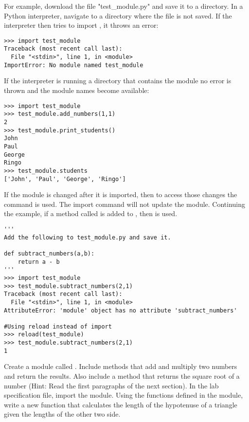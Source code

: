 For example, download the file "test\_module.py" and save it to a directory.
In a Python interpreter, navigate to a directory where the file is not saved.
If the interpreter then tries to import , it throws an error:

\begin{lstlisting}
>>> import test_module
Traceback (most recent call last):
  File "<stdin>", line 1, in <module>
ImportError: No module named test_module
\end{lstlisting}

If the interpreter is running a directory that contains the module no error is thrown and the module names become available:

\begin{lstlisting}
>>> import test_module
>>> test_module.add_numbers(1,1)
2
>>> test_module.print_students()
John
Paul
George
Ringo
>>> test_module.students
['John', 'Paul', 'George', 'Ringo']
\end{lstlisting}

If the module is changed after it is imported, then to access those changes the  command is used.
The import command will not update the module.
Continuing the example, if a method called  is added to , then  is used.

\begin{lstlisting}
'''
Add the following to test_module.py and save it.

def subtract_numbers(a,b):
	return a - b
'''
>>> import test_module
>>> test_module.subtract_numbers(2,1)
Traceback (most recent call last):
  File "<stdin>", line 1, in <module>
AttributeError: 'module' object has no attribute 'subtract_numbers'

#Using reload instead of import
>>> reload(test_module)
>>> test_module.subtract_numbers(2,1)
1
\end{lstlisting}

\begin{problem}

Create a module called .
Include methods that add and multiply two numbers and return the results.
Also include a method that returns the square root of a number (Hint:  Read the first paragraphs of the next section).
In the lab specification file, import the  module.
Using the functions defined in the module, write a new function that calculates the length of the hypotenuse of a triangle given the lengths of the other two side.
\end{problem}

